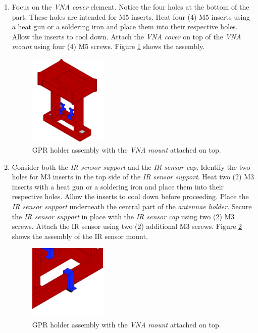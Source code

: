 \documentclass{article}
\begin{document}
\begin{enumerate}
    \item Focus on the \textit{VNA cover} element. Notice the four holes at the bottom of the part. These holes are intended for M5 inserts. Heat four (4) M5 inserts using a heat gun or a soldering iron and place them into their respective holes. Allow the inserts to cool down. Attach the \textit{VNA cover} on top of the \textit{VNA mount} using four (4) M5 screws. Figure \ref{fig:vna_holder_7} shows the assembly.
    
    \begin{figure}[H]
        \centering
        \includegraphics[width=0.35\textwidth]{images/vna_holder/step_G.png}
        \caption{GPR holder assembly with the \textit{VNA mount} attached on top.}
        \label{fig:vna_holder_7}
    \end{figure}
    
    \item Consider both the \textit{IR sensor support} and the \textit{IR sensor cap}. Identify the two holes for M3 inserts in the top side of the \textit{IR sensor support}. Heat two (2) M3 inserts with a heat gun or a soldering iron and place them into their respective holes. Allow the inserts to cool down before proceeding. Place the \textit{IR sensor support} underneath the central part of the \textit{antennae holder}. Secure the \textit{IR sensor support} in place with the \textit{IR sensor cap} using two (2) M3 screws. Attach the IR sensor using two (2) additional M3 screws. Figure \ref{fig:vna_holder_8} shows the assembly of the IR sensor mount.
    
    \begin{figure}[H]
        \centering
        \includegraphics[width=0.35\textwidth]{images/vna_holder/step_H.png}
        \caption{GPR holder assembly with the \textit{VNA mount} attached on top.}
        \label{fig:vna_holder_8}
    \end{figure}
    
\end{enumerate}
\end{document}
